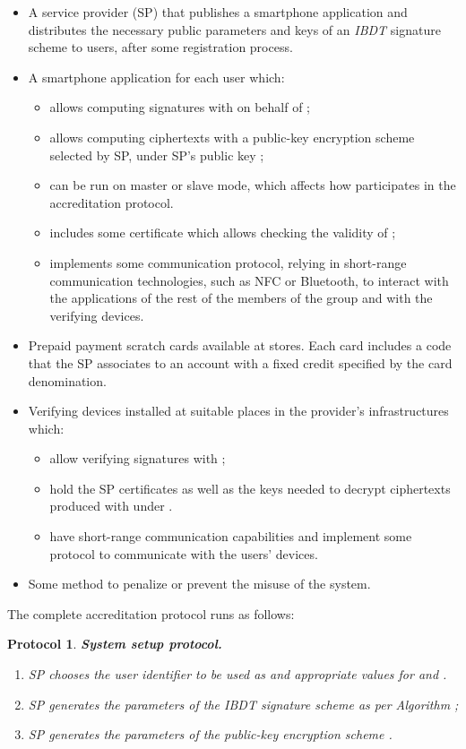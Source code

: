 \documentclass[11pt]{llncs}
\newtheorem{proto}{Protocol}
\begin{document}
\begin{itemize}
\item A service provider (SP) that publishes a smartphone
application  and distributes the
necessary public parameters and keys of an
\emph{IBDT} signature scheme  to users,
after some registration process.
\item A smartphone application  for each user  which:
\begin{itemize}
\item allows computing signatures with  on behalf of ;
\item allows computing ciphertexts with a
public-key encryption scheme  selected by
SP, under SP's public key ;
\item can be run on master or slave mode,
which affects how 
participates in the accreditation protocol.
\item includes some certificate which allows
checking the validity of ;
\item implements some communication protocol, relying in
short-range communication technologies, such as NFC or
Bluetooth, to interact with the applications of the rest of
the members of the group and with the verifying devices.
\end{itemize}
\item Prepaid payment scratch cards available at stores.
Each card includes a code  that the SP
associates to an account with a fixed credit specified by the card
denomination.
\item Verifying devices installed at suitable places in the provider's
infrastructures which:
\begin{itemize}
\item allow verifying signatures with ;
\item hold the SP certificates as well as the keys needed to decrypt
ciphertexts produced with  under .
\item have short-range communication capabilities and implement
some protocol to communicate with the users' devices.
\end{itemize}
\item Some method to penalize or prevent the misuse of the system.
\end{itemize}

The complete accreditation protocol runs as follows:

\begin{proto}
\textbf{System setup protocol.}
\begin{enumerate}
\item SP chooses the user identifier
to be used as  and appropriate values for  and .
\item SP generates the parameters of the \emph{IBDT} signature
scheme  as per Algorithm ;
\item SP generates the parameters of
the public-key encryption scheme .
\end{enumerate}
\end{proto}
\end{document}

